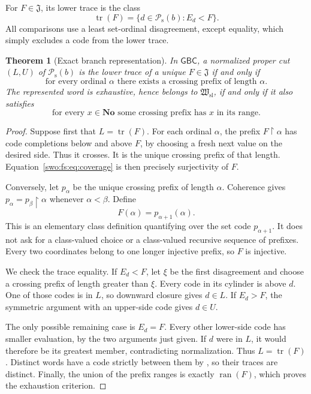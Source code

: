\documentclass[11pt]{article}
\newtheorem{theorem}{Theorem}[section]
\theoremstyle{definition}
\theoremstyle{remark}
\newcommand{\No}{\mathbf{No}}
\newcommand{\Hsl}{\mathfrak W_{\mathrm{sl}}}
\newcommand{\Jinj}{\mathfrak J}
\newcommand{\Psupp}{\mathcal P_{\mathrm{s}}}
\newcommand{\ran}{\operatorname{ran}}
\newcommand{\restr}{\mathbin{\upharpoonright}}
\newcommand{\GBC}{\mathsf{GBC}}
\begin{document}
For $F\in \Jinj$, its lower trace is the class
\[
                       \operatorname{tr}(F)=\{d\in \Psupp(b):E_d<F\}.
\]
All comparisons use a least set-ordinal disagreement, except equality,
which simply excludes a code from the lower trace.

\begin{theorem}[Exact branch representation]\label{swo:fs:thm:reconstruction}
In $\GBC$, a normalized proper cut $(L,U)$ of $\Psupp(b)$ is the lower trace
of a unique $F\in \Jinj$ if and only if
\[\tag{S13.1}\label{swo:fs:eq:crossall}
 \text{for every ordinal }\alpha\text{ there exists a crossing prefix
 of length }\alpha.
\]
The represented word is exhaustive, hence belongs to $\Hsl$, if and
only if it also satisfies
\[\tag{S13.2}\label{swo:fs:eq:coverage}
 \text{for every }x\in\No\text{ some crossing prefix has }x
 \text{ in its range}.
\]
\end{theorem}
\begin{proof}
Suppose first that $L=\operatorname{tr}(F)$. For each ordinal $\alpha$, the prefix
$F\restr\alpha$ has code completions below and above $F$, by choosing
a fresh next value on the desired side. Thus it crosses. It is the
unique crossing prefix of that length. Equation~\eqref{swo:fs:eq:coverage}
is then precisely surjectivity of $F$.

Conversely, let $p_\alpha$ be the unique crossing prefix of length
$\alpha$. Coherence gives $p_\alpha=p_\beta\restr\alpha$ whenever
$\alpha<\beta$. Define
\[
                            F(\alpha)=p_{\alpha+1}(\alpha).
\]
This is an elementary class definition quantifying over the set code
$p_{\alpha+1}$. It does not ask for a class-valued choice or a
class-valued recursive sequence of prefixes. Every two coordinates
belong to one longer injective prefix, so $F$ is injective.

We check the trace equality. If $E_d<F$, let $\xi$ be the first
disagreement and choose a crossing prefix of length greater than
$\xi$. Every code in its cylinder is above $d$. One of those codes is
in $L$, so downward closure gives $d\in L$. If $E_d>F$, the symmetric
argument with an upper-side code gives $d\in U$.

The only possible remaining case is $E_d=F$. Every other lower-side
code has smaller evaluation, by the two arguments just given. If $d$
were in $L$, it would therefore be its greatest member, contradicting
normalization. Thus $L=\operatorname{tr}(F)$. Distinct words have a code strictly
between them by , so their traces are
distinct. Finally, the union of the prefix ranges is exactly $\ran(F)$,
which proves the exhaustion criterion.
\end{proof}
\end{document}
